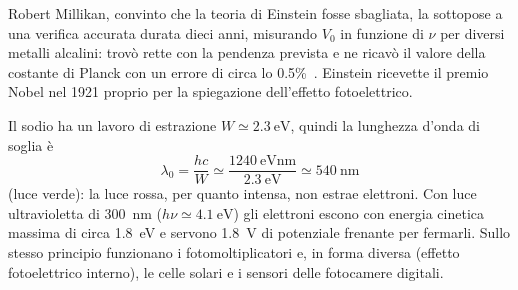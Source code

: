 Robert Millikan, convinto che la teoria di Einstein fosse sbagliata, la sottopose a una verifica accurata durata dieci anni, misurando $V_0$ in funzione di $\nu$ per diversi metalli alcalini: trovò rette con la pendenza prevista e ne ricavò il valore della costante di Planck con un errore di circa lo 0.5\%~\cite{millikan1916}. Einstein ricevette il premio Nobel nel 1921 proprio per la spiegazione dell'effetto fotoelettrico.
\begin{Es}
  Il sodio ha un lavoro di estrazione $W\simeq\SI{2.3}{\electronvolt}$, quindi la lunghezza d'onda di soglia è
  \[
    \lambda_0=\frac{hc}{W}\simeq\frac{\SI{1240}{\electronvolt\nano\meter}}{\SI{2.3}{\electronvolt}}\simeq\SI{540}{\nano\meter}
  \]
  (luce verde): la luce rossa, per quanto intensa, non estrae elettroni. Con luce ultravioletta di \SI{300}{\nano\meter} ($h\nu\simeq\SI{4.1}{\electronvolt}$) gli elettroni escono con energia cinetica massima di circa \SI{1.8}{\electronvolt} e servono \SI{1.8}{\volt} di potenziale frenante per fermarli. Sullo stesso principio funzionano i fotomoltiplicatori e, in forma diversa (effetto fotoelettrico interno), le celle solari e i sensori delle fotocamere digitali.
\end{Es}


